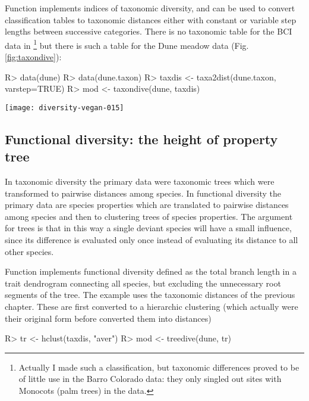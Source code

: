 \documentclass[article,nojss]{jss}
\begin{document}
Function  implements indices of taxonomic diversity,
and  can be used to convert classification tables to
taxonomic distances either with constant or variable step lengths
between successive categories. There is no taxonomic table for the BCI
data in \footnote{Actually I made such a classification,
  but taxonomic differences proved to be of little use in the Barro
  Colorado data: they only singled out sites with Monocots (palm
  trees) in the data.}
but there is such a table for the Dune meadow data (Fig. \ref{fig:taxondive}):
\begin{Schunk}
\begin{Sinput}
R> data(dune)
R> data(dune.taxon)
R> taxdis <- taxa2dist(dune.taxon, varstep=TRUE)
R> mod <- taxondive(dune, taxdis)
\end{Sinput}
\end{Schunk}
\begin{SCfigure}
\texttt{[image: diversity-vegan-015]}
\caption{Taxonomic diversity $\Delta^+$ for the dune meadow data. The
  points are diversity values of single sites, and the funnel is their
  approximate confidence intervals ($2 \times$ standard error).}
\label{fig:taxondive}
\end{SCfigure}

\subsection{Functional diversity: the height of property tree}

In taxonomic diversity the primary data were taxonomic trees which
were transformed to pairwise distances among species. In functional
diversity the primary data are species properties which are translated
to pairwise distances among species and then to clustering trees of
species properties. The argument for trees is that in this way a
single deviant species will have a small influence, since its
difference is evaluated only once instead of evaluating its distance
to all other species.

Function  implements functional diversity defined as
the total branch length in a trait dendrogram connecting all species,
but excluding the unnecessary root segments of the tree.  The example
uses the taxonomic distances of the previous chapter. These are first
converted to a hierarchic clustering (which actually were their
original form before  converted them into distances)
\begin{Schunk}
\begin{Sinput}
R> tr <- hclust(taxdis, "aver")
R> mod <- treedive(dune, tr)
\end{Sinput}
\end{Schunk}
\end{document}
